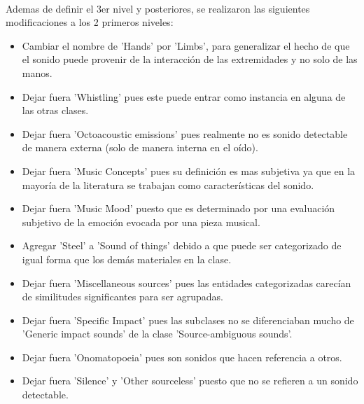 \documentclass[12pt]{article}
\begin{document}
	\paragraph{}
	Ademas de definir el 3er nivel y posteriores, se realizaron las siguientes modificaciones a los 2 primeros niveles:
	\begin{itemize}
		\item Cambiar el nombre de 'Hands' por 'Limbs', para generalizar el hecho de que el sonido puede provenir de la interacción de las extremidades y no solo de las manos.
		\item Dejar fuera 'Whistling' pues este puede entrar como instancia en alguna de las otras clases.
		\item Dejar fuera 'Octoacoustic emissions' pues realmente no es sonido detectable de manera externa (solo de manera interna en el oído).
		\item Dejar fuera 'Music Concepts' pues su definición es mas subjetiva ya que en la mayoría de la literatura se trabajan como características del sonido.
		\item Dejar fuera 'Music Mood' puesto que es determinado por una evaluación subjetivo de la emoción evocada por una pieza musical.
		\item Agregar 'Steel' a 'Sound of things' debido a que puede ser categorizado de igual forma que los demás materiales en la clase.
		\item Dejar fuera 'Miscellaneous sources' pues las entidades categorizadas carecían de similitudes significantes para ser agrupadas.
		\item Dejar fuera 'Specific Impact' pues las subclases no se diferenciaban mucho de 'Generic impact sounds' de la clase 'Source-ambiguous sounds'.
		\item Dejar fuera 'Onomatopoeia' pues son sonidos que hacen referencia a otros.
		\item Dejar fuera 'Silence' y 'Other sourceless' puesto que no se refieren a un sonido detectable.
	\end{itemize}
\pagebreak
\end{document}
